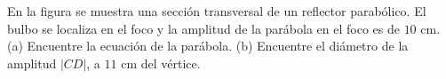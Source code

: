 \item En la figura se muestra una sección transversal de un reflector parabólico. El bulbo se localiza en el foco y la amplitud de la parábola en el foco es de $10 \text{ cm}$. (a) Encuentre la ecuación de la parábola. (b) Encuentre el diámetro de la amplitud $|CD|$, a $11 \text{ cm}$ del vértice.
